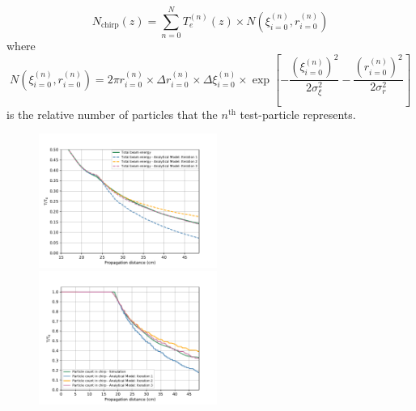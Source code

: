 \begin{equation}
N_{\text{chirp}}(z)= \sum_{n=0}^N T_e^{(n)}(z)\times N(\xi_{i=0}^{(n)},r_{i=0}^{(n)})
\end{equation}
where
\begin{equation}
N\left(\xi_{i=0}^{(n)},r_{i=0}^{(n)}\right)=2\pi r_{i=0}^{(n)}\times\Delta r_{i=0}^{(n)}\times\Delta \xi_{i=0}^{(n)}\times\exp[-\frac{\left(\xi_{i=0}^{(n)}\right)^2}{2\sigma_{\xi}^2}-\frac{\left(r_{i=0}^{(n)}\right)^2}{2\sigma_{r}^2}]
\end{equation}
is the relative number of particles that the $n^{\text{th}}$ test-particle represents.
\begin{figure}
\centering
\includegraphics[width=0.52\textwidth]{IterationsEnergy.pdf}\hspace{-25pt}
\includegraphics[width=0.52\textwidth]{Particlesinbeamconstant1to102.pdf}
\end{figure}






